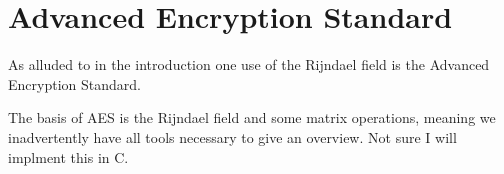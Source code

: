 
\chapter{Advanced Encryption Standard}
As alluded to in the introduction one use of the Rijndael field is the Advanced Encryption Standard.

The basis of AES is the Rijndael field and some matrix operations,
meaning we inadvertently have all tools necessary to give an overview.
Not sure I will implment this in C.
